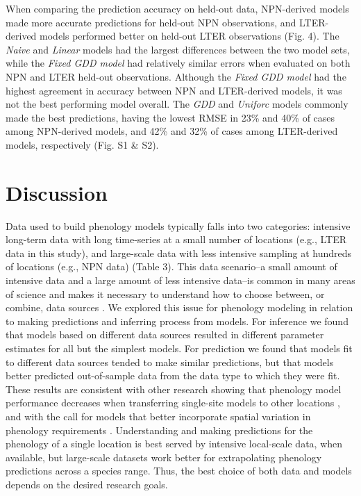 \documentclass[fleqn,12pt,lineno]{article}
\begin{document}
When comparing the prediction accuracy on held-out data, NPN-derived models made more accurate predictions for held-out NPN observations, and LTER-derived models performed better on held-out LTER observations (Fig. 4). The \textit{Naive} and \textit{Linear} models had the largest differences between the two model sets, while the \textit{Fixed GDD model} had relatively similar errors when evaluated on both NPN and LTER held-out observations. Although the \textit{Fixed GDD model} had the highest agreement in accuracy between NPN and LTER-derived models, it was not the best performing model overall. The \textit{GDD} and \textit{Uniforc} models commonly made the best predictions, having the lowest RMSE in 23\% and 40\% of cases among NPN-derived models, and 42\% and 32\% of cases among LTER-derived models, respectively (Fig. S1 \& S2).

\section*{Discussion}

Data used to build phenology models typically falls into two categories: intensive long-term data with long time-series at a small number of locations (e.g., LTER data in this study), and large-scale data with less intensive sampling at hundreds of locations (e.g., NPN data) (Table 3). This data scenario--a small amount of intensive data and a large amount of less intensive data--is common in many areas of science and makes it necessary to understand how to choose between, or combine, data sources \citep{hanks2018}. We explored this issue for phenology modeling in relation to making predictions and inferring process from models. For inference we found that models based on different data sources resulted in different parameter estimates for all but the simplest models. For prediction we found that models fit to different data sources tended to make similar predictions, but that models better predicted out-of-sample data from the data type to which they were fit. These results are consistent with other research showing that phenology model performance decreases when transferring single-site models to other locations \citep{garcia-mozo2008, xu2013, basler2016}, and with the call for models that better incorporate spatial variation in phenology requirements \citep{richardson2013, chuine2017}. Understanding and making predictions for the phenology of a single location is best served by intensive local-scale data, when available, but large-scale datasets work better for extrapolating phenology predictions across a species range. Thus, the best choice of both data and models depends on the desired research goals.
\end{document}
